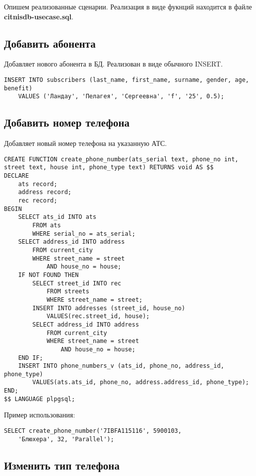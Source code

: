 \documentclass{report}
\begin{document}
Опишем реализованные сценарии. Реализация в виде
фукнций находится в файле \textbf{citnisdb-usecase.sql}.

\subsection*{Добавить абонента}

Добавляет нового абонента в БД. Реализован в виде обычного INSERT.

\begin{lstlisting}
INSERT INTO subscribers (last_name, first_name, surname, gender, age, benefit)
	VALUES ('Ландау', 'Пелагея', 'Сергеевна', 'f', '25', 0.5);
\end{lstlisting}

\subsection*{Добавить номер телефона}

Добавляет новый номер телефона на указанную АТС.

\begin{lstlisting}
CREATE FUNCTION create_phone_number(ats_serial text, phone_no int, street text, house int, phone_type text) RETURNS void AS $$
DECLARE
    ats record;
    address record;
    rec record;
BEGIN
    SELECT ats_id INTO ats 
        FROM ats 
        WHERE serial_no = ats_serial;
    SELECT address_id INTO address
        FROM current_city
        WHERE street_name = street
            AND house_no = house;
    IF NOT FOUND THEN
        SELECT street_id INTO rec 
            FROM streets 
            WHERE street_name = street;
        INSERT INTO addresses (street_id, house_no)
            VALUES(rec.street_id, house);
        SELECT address_id INTO address
            FROM current_city
            WHERE street_name = street
                AND house_no = house;
    END IF;
    INSERT INTO phone_numbers_v (ats_id, phone_no, address_id, phone_type)
        VALUES(ats.ats_id, phone_no, address.address_id, phone_type);
END;
$$ LANGUAGE plpgsql;
\end{lstlisting}

Пример использования:
\begin{lstlisting}
SELECT create_phone_number('7IBFA115116', 5900103,
    'Блюхера', 32, 'Parallel');
\end{lstlisting}

\subsection*{Изменить тип телефона}
\end{document}
